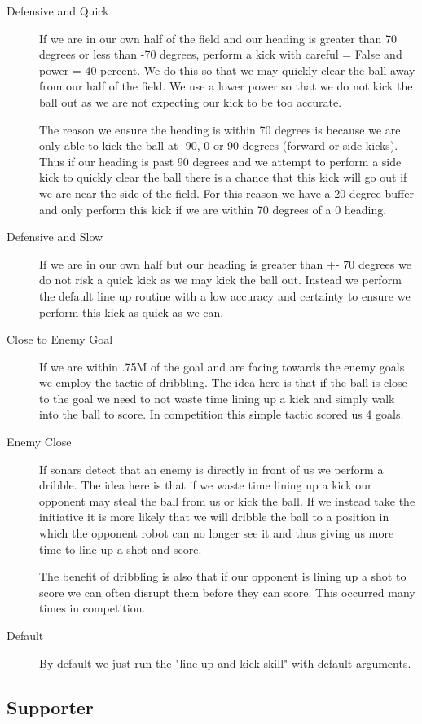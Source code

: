 \documentclass[pdftex,11pt,a4paper]{report}
\begin{document}
\begin{description}
\item[Defensive and Quick] If we are in our own half of the field and our heading is greater than 70 degrees or less than -70 degrees, perform a kick with careful = False and power = 40 percent. We do this so that we may quickly clear the ball away from our half of the field. We use a lower power so that we do not kick the ball out as we are not expecting our kick to be too accurate.

The reason we ensure the heading is within 70 degrees is because we are only able to kick the ball at -90, 0 or 90 degrees (forward or side kicks). Thus if our heading is past 90 degrees and we attempt to perform a side kick to quickly clear the ball there is a chance that this kick will go out if we are near the side of the field. For this reason we have a 20 degree buffer and only perform this kick if we are within 70 degrees of a 0 heading.
\item[Defensive and Slow] If we are in our own half but our heading is greater than +- 70 degrees we do not risk a quick kick as we may kick the ball out. Instead we perform the default line up routine with a low accuracy and certainty to ensure we perform this kick as quick as we can.
\item[Close to Enemy Goal] If we are within .75M of the goal and are facing towards the enemy goals we employ the tactic of dribbling. The idea here is that if the ball is close to the goal we need to not waste time lining up a kick and simply walk into the ball to score. In competition this simple tactic scored us 4 goals.
\item[Enemy Close] If sonars detect that an enemy is directly in front of us we perform a dribble. The idea here is that if we waste time lining up a kick our opponent may steal the ball from us or kick the ball. If we instead take the initiative it is more likely that we will dribble the ball to a position in which the opponent robot can no longer see it and thus giving us more time to line up a shot and score.

The benefit of dribbling is also that if our opponent is lining up a shot to score we can often disrupt them before they can score. This occurred many times in competition.
\item[Default] By default we just run the "line up and kick skill" with default arguments.
\end{description}

\subsection{Supporter}
\end{document}
